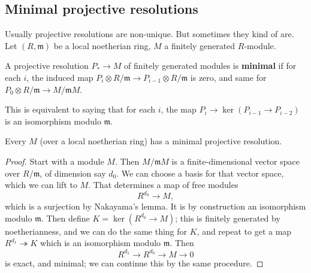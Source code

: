 \subsection{Minimal projective resolutions}
Usually projective resolutions are non-unique. But sometimes
they kind of are.
Let $(R, \mathfrak{m})$ be a local noetherian ring, $M$ a
finitely generated $R$-module.

\begin{definition}
A projective resolution $P_* \to M$ of finitely generated
modules is \textbf{minimal} if for each $i$, the
induced map $P_i \otimes R/\mathfrak{m} \to P_{i-1} \otimes
R/\mathfrak{m}$ is
zero, and same for $P_0 \otimes R/\mathfrak{m} \to
M/\mathfrak{m}M$.
\end{definition}

This is equivalent to saying that for each $i$, the map $P_i
\to\ker(P_{i-1}
\to P_{i-2})$ is an isomorphism modulo $\mathfrak{m}$.

\begin{proposition}
Every $M$ (over a local noetherian ring) has a minimal
projective resolution.
\end{proposition}
\begin{proof}
Start with a module $M$. Then $M/\mathfrak{m}M$ is a
finite-dimensional vector
space over $R/\mathfrak{m}$, of dimension say $d_0$. We can
choose a basis for that vector space, which
we can lift to $M$. That determines a map of free modules
\[ R^{d_0} \to M,  \]
which is a surjection by Nakayama's lemma. It is by construction
an
isomorphism modulo $\mathfrak{m}$. Then define $K =
\ker(R^{d_0}\to M)$; this
is finitely generated by noetherianness, and we
can do the same thing for $K$, and repeat to get a map $R^{d_1}
\twoheadrightarrow K$ which is an isomorphism modulo
$\mathfrak{m}$. Then
\[ R^{d_1} \to R^{d_0} \to M \to 0  \]
is exact, and minimal; we can continue this by the same
procedure.
\end{proof}


